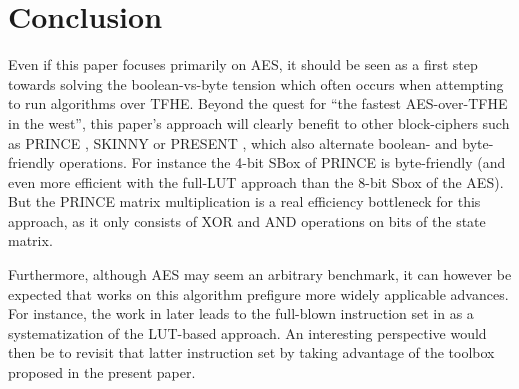 \section{Conclusion}

Even if this paper focuses primarily on AES, it should be seen as a first step towards solving the boolean-vs-byte tension which often occurs when attempting to run algorithms over TFHE. Beyond the quest for ``the fastest AES-over-TFHE in the west'', this paper's approach will clearly benefit to other block-ciphers such as PRINCE \cite{PRINCE}, SKINNY \cite{skinny} or PRESENT \cite{present}, which also alternate boolean- and byte-friendly operations. For instance the 4-bit SBox of PRINCE is byte-friendly (and even more efficient with the full-LUT approach than the 8-bit Sbox of the AES). But the PRINCE matrix multiplication is a real efficiency bottleneck for this approach, as it only consists of XOR and AND operations on bits of the state matrix.

Furthermore, although AES may seem an arbitrary benchmark, it can however be expected that works on this algorithm prefigure more widely applicable advances. For instance, the work in \cite{DBLP:conf/wahc/TramaCBS23} later leads to the full-blown instruction set in \cite{d8fp} as a systematization of the LUT-based approach. An interesting perspective would then be to revisit that latter instruction set by taking advantage of the toolbox proposed in the present paper. %






